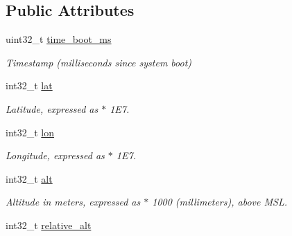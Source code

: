 \subsection*{Public Attributes}
\begin{DoxyCompactItemize}
\item 
\hypertarget{struct____mavlink__global__position__int__t_a1b56c431f19cff6fadc2b0ac3b5959b6}{uint32\+\_\+t \hyperlink{struct____mavlink__global__position__int__t_a1b56c431f19cff6fadc2b0ac3b5959b6}{time\+\_\+boot\+\_\+ms}}\label{struct____mavlink__global__position__int__t_a1b56c431f19cff6fadc2b0ac3b5959b6}

\begin{DoxyCompactList}\small\item\em Timestamp (milliseconds since system boot) \end{DoxyCompactList}\item 
\hypertarget{struct____mavlink__global__position__int__t_a949653d08153161bb49b94794169a70f}{int32\+\_\+t \hyperlink{struct____mavlink__global__position__int__t_a949653d08153161bb49b94794169a70f}{lat}}\label{struct____mavlink__global__position__int__t_a949653d08153161bb49b94794169a70f}

\begin{DoxyCompactList}\small\item\em Latitude, expressed as $\ast$ 1\+E7. \end{DoxyCompactList}\item 
\hypertarget{struct____mavlink__global__position__int__t_a2350bdf8af429bc2ed49b7cfac61cee7}{int32\+\_\+t \hyperlink{struct____mavlink__global__position__int__t_a2350bdf8af429bc2ed49b7cfac61cee7}{lon}}\label{struct____mavlink__global__position__int__t_a2350bdf8af429bc2ed49b7cfac61cee7}

\begin{DoxyCompactList}\small\item\em Longitude, expressed as $\ast$ 1\+E7. \end{DoxyCompactList}\item 
\hypertarget{struct____mavlink__global__position__int__t_a1d9e69a26dc214bd624c9474ca3d79f4}{int32\+\_\+t \hyperlink{struct____mavlink__global__position__int__t_a1d9e69a26dc214bd624c9474ca3d79f4}{alt}}\label{struct____mavlink__global__position__int__t_a1d9e69a26dc214bd624c9474ca3d79f4}

\begin{DoxyCompactList}\small\item\em Altitude in meters, expressed as $\ast$ 1000 (millimeters), above M\+S\+L. \end{DoxyCompactList}\item 
\hypertarget{struct____mavlink__global__position__int__t_a1b3d36234adcacbedc88c37c1712f4b1}{int32\+\_\+t \hyperlink{struct____mavlink__global__position__int__t_a1b3d36234adcacbedc88c37c1712f4b1}{relative\+\_\+alt}}\label{struct____mavlink__global__position__int__t_a1b3d36234adcacbedc88c37c1712f4b1}


\end{DoxyCompactItemize}
